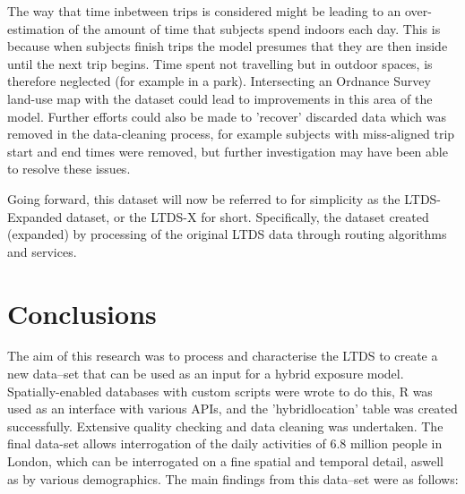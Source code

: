 The way that time inbetween trips is considered might be leading to an over-estimation of the amount of time that subjects spend indoors each day. This is because when subjects finish trips the model presumes that they are then inside until the next trip begins. Time spent not travelling but in outdoor spaces, is therefore neglected (for example in a park). Intersecting an Ordnance Survey land-use map with the dataset could lead to improvements in this area of the model. Further efforts could also be made to 'recover' discarded data which was removed in the data-cleaning process, for example subjects with miss-aligned trip start and end times were removed, but further investigation may have been able to resolve these issues.

Going forward, this dataset will now be referred to for simplicity as the LTDS-Expanded dataset, or the LTDS-X for short.  Specifically, the dataset created (expanded) by processing of the original LTDS data through routing algorithms and services.

\section{Conclusions}
\label{sec:1conclusions}

The aim of this research was to process and characterise the LTDS to create a new data--set that can be used as an input for a hybrid exposure model. Spatially-enabled databases with custom scripts were wrote to do this, R was used as an interface with various APIs, and the 'hybrid\textunderscore location' table was created successfully. Extensive quality checking and data cleaning was undertaken. The final data-set allows interrogation of the daily activities of 6.8 million people in London, which can be interrogated on a fine spatial and temporal detail, aswell as by various demographics. The main findings from this data--set were as follows:

